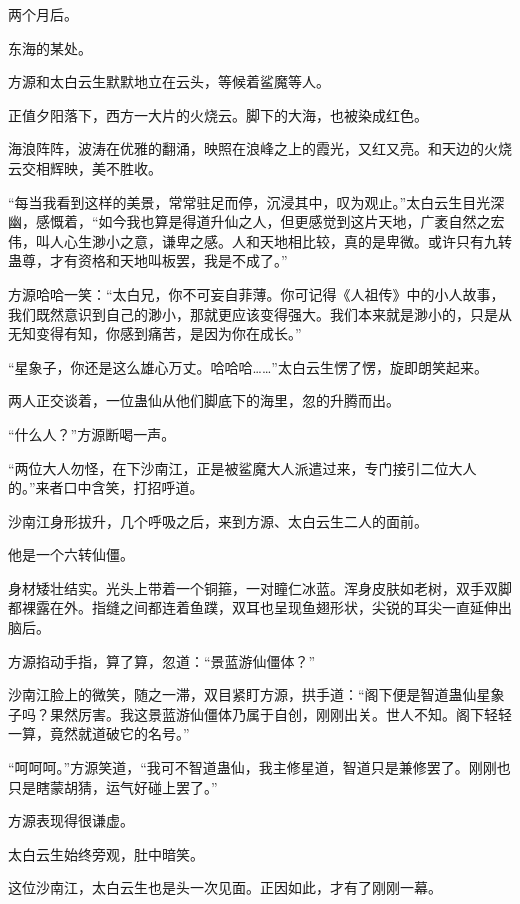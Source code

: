 
\begin{this_body}



两个月后。

东海的某处。

方源和太白云生默默地立在云头，等候着鲨魔等人。

正值夕阳落下，西方一大片的火烧云。脚下的大海，也被染成红色。

海浪阵阵，波涛在优雅的翻涌，映照在浪峰之上的霞光，又红又亮。和天边的火烧云交相辉映，美不胜收。

“每当我看到这样的美景，常常驻足而停，沉浸其中，叹为观止。”太白云生目光深幽，感慨着，“如今我也算是得道升仙之人，但更感觉到这片天地，广袤自然之宏伟，叫人心生渺小之意，谦卑之感。人和天地相比较，真的是卑微。或许只有九转蛊尊，才有资格和天地叫板罢，我是不成了。”

方源哈哈一笑：“太白兄，你不可妄自菲薄。你可记得《人祖传》中的小人故事，我们既然意识到自己的渺小，那就更应该变得强大。我们本来就是渺小的，只是从无知变得有知，你感到痛苦，是因为你在成长。”

“星象子，你还是这么雄心万丈。哈哈哈……”太白云生愣了愣，旋即朗笑起来。

两人正交谈着，一位蛊仙从他们脚底下的海里，忽的升腾而出。

“什么人？”方源断喝一声。

“两位大人勿怪，在下沙南江，正是被鲨魔大人派遣过来，专门接引二位大人的。”来者口中含笑，打招呼道。

沙南江身形拔升，几个呼吸之后，来到方源、太白云生二人的面前。

他是一个六转仙僵。

身材矮壮结实。光头上带着一个铜箍，一对瞳仁冰蓝。浑身皮肤如老树，双手双脚都裸露在外。指缝之间都连着鱼蹼，双耳也呈现鱼翅形状，尖锐的耳尖一直延伸出脑后。

方源掐动手指，算了算，忽道：“景蓝游仙僵体？”

沙南江脸上的微笑，随之一滞，双目紧盯方源，拱手道：“阁下便是智道蛊仙星象子吗？果然厉害。我这景蓝游仙僵体乃属于自创，刚刚出关。世人不知。阁下轻轻一算，竟然就道破它的名号。”

“呵呵呵。”方源笑道，“我可不智道蛊仙，我主修星道，智道只是兼修罢了。刚刚也只是瞎蒙胡猜，运气好碰上罢了。”

方源表现得很谦虚。

太白云生始终旁观，肚中暗笑。

这位沙南江，太白云生也是头一次见面。正因如此，才有了刚刚一幕。


\end{this_body}
